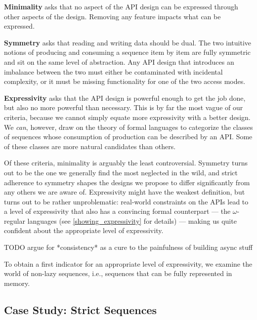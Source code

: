 \documentclass[sigplan,screen,10pt,anonymous,review]{acmart}
\begin{document}
\textbf{Minimality} asks that no aspect of the API design can be expressed through other aspects of the design. Removing any feature impacts what can be expressed.


\textbf{Symmetry} asks that reading and writing data should be dual. The two intuitive notions of producing and consuming a sequence item by item are fully symmetric and sit on the same level of abstraction. Any API design that introduces an imbalance between the two must either be contaminated with incidental complexity, or it must be missing functionality for one of the two access modes.

\textbf{Expressivity} asks that the API design is powerful enough to get the job done, but also no more powerful than necessary. This is by far the most vague of our criteria, because we cannot simply equate more expressivity with a better design. We \textit{can}, however, draw on the theory of formal languages to categorize the classes of sequences whose consumption of production can be described by an API. Some of these classes are more natural candidates than others.

Of these criteria, minimality is arguably the least controversial. Symmetry turns out to be the one we generally find the most neglected in the wild, and strict adherence to symmetry shapes the designs we propose to differ significantly from any others we are aware of. Expressivity might have the weakest definition, but turns out to be rather unproblematic: real-world constraints on the APIs lead to a level of expressivity that also has a convincing formal counterpart --- the $\omega$-regular languages (see \cref{showing_expressivity} for details) --- making us quite confident about the appropriate level of expressivity.

TODO argue for *consistency* as a cure to the painfulness of building async stuff

To obtain a first indicator for an appropriate level of expressivity, we examine the world of non-lazy sequences, i.e., sequences that can be fully represented in memory.

\subsection{Case Study: Strict Sequences}
\end{document}
